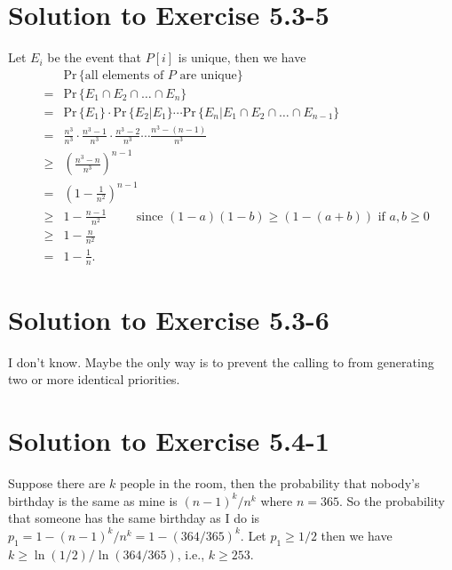 \documentclass[a4paper, fleqn]{article}
\begin{document}
\section*{Solution to Exercise 5.3-5}

Let $E_i$ be the event that $P[i]$ is unique, then we have
\begin{eqnarray*}
& & \mbox{Pr}\,\{\mbox{all elements of } P \mbox{ are unique}\}  \\
& = & \mbox{Pr}\,\{E_1 \cap E_2 \cap \ldots \cap E_n \} \\
& = & \mbox{Pr}\,\{E_1\} \cdot \mbox{Pr}\,\{E_2|E_1\} \cdots \mbox{Pr}\,\{E_n | E_1 \cap E_2 \cap \ldots \cap E_{n-1}\} \\
& = & \frac{n^3}{n^3} \cdot \frac{n^3 - 1}{n^3} \cdot \frac{n^3 - 2}{n^3} \cdots \frac{n^3 - (n - 1)}{n^3} \\
& \geq & \left(\frac{n^3 - n}{n^3}\right)^{n-1} \\
& = & \left(1 - \frac{1}{n^2}\right)^{n-1} \\
& \geq & 1 - \frac{n-1}{n^2} \hspace{1cm}  \mbox{since } (1 - a)(1 - b) \geq (1 - (a + b)) \mbox{ if } a, b \geq 0 \\
& \geq & 1 - \frac{n}{n^2} \\
& = & 1 - \frac{1}{n}.
\end{eqnarray*}









\section*{Solution to Exercise 5.3-6}

I don't know. Maybe the only way is to prevent the calling to  from
generating two or more identical priorities.








\section*{Solution to Exercise 5.4-1}

Suppose there are $k$ people in the room, then the probability that nobody's
birthday is the same as mine is $(n - 1)^k/n^k$ where $n = 365$. So the probability
that someone has the same birthday as I do is $p_1 = 1 - (n - 1)^k/n^k = 1 - (364/365)^k$.
Let $p_1 \geq 1/2$ then we have $k \geq \ln(1/2)/\ln(364/365)$, i.e., $k \geq 253$.
\end{document}
